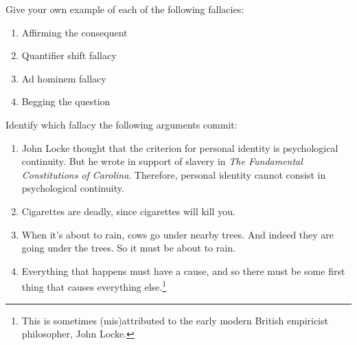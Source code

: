 

\begin{practiceproblems}

\problempart Give your own example of each of the following fallacies:
\begin{enumerate}
\item Affirming the consequent
\item Quantifier shift fallacy
\item Ad hominem fallacy
\item Begging the question
\end{enumerate}

\problempart Identify which fallacy the following arguments commit:
\begin{enumerate}
\item John Locke thought that the criterion for personal identity is psychological continuity. But he wrote in support of slavery in \emph{The Fundamental Constitutions of Carolina}. Therefore, personal identity cannot consist in psychological continuity.
\item Cigarettes are deadly, since cigarettes will kill you.
\item When it's about to rain, cows go under nearby trees. And indeed they are going under the trees. So it must be about to rain.
\item Everything that happens must have a cause, and so there must be some first thing that causes everything else.\footnote{This is sometimes (mis)attributed to the early modern British empiricist philosopher, John Locke.}
\end{enumerate}

\end{practiceproblems}



